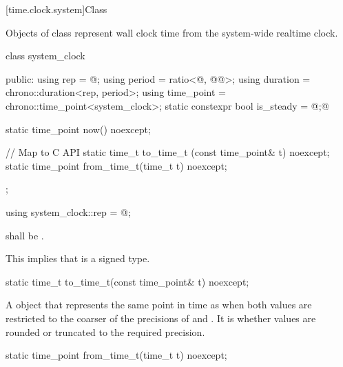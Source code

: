 [time.clock.system]{Class }
%

\pnum
Objects of class  represent wall clock time from the system-wide
realtime clock.

\begin{codeblock}
class system_clock {
public:
  using rep        = @\seebelow@;
  using period     = ratio<@\unspecnc@, @\unspec{}@>;
  using duration   = chrono::duration<rep, period>;
  using time_point = chrono::time_point<system_clock>;
  static constexpr bool is_steady = @\unspec;@

  static time_point now() noexcept;

  // Map to C API
  static time_t      to_time_t  (const time_point& t) noexcept;
  static time_point  from_time_t(time_t t) noexcept;
};
\end{codeblock}

%
\begin{itemdecl}
using system_clock::rep = @\unspec@;
\end{itemdecl}

\begin{itemdescr}
\pnum
\requires {} shall
be . \begin{note} This implies that  is a signed type. \end{note}
\end{itemdescr}

%
\begin{itemdecl}
static time_t to_time_t(const time_point& t) noexcept;
\end{itemdecl}

\begin{itemdescr}
\pnum
\returns A  object that represents the same point in time as 
when both values are restricted to the coarser of the precisions of  and
.
It is 
whether values are rounded or truncated to the required precision.
\end{itemdescr}

%
\begin{itemdecl}
static time_point from_time_t(time_t t) noexcept;
\end{itemdecl}

